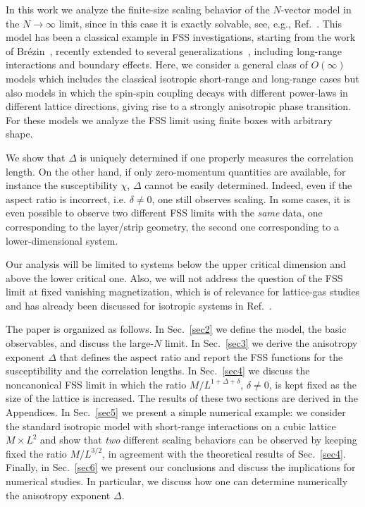 \documentclass[a4paper,12pt]{article}
\begin{document}
In this work we analyze the finite-size scaling behavior of the
$N$-vector model in the  $N \to \infty$ limit, since in this case it
is exactly solvable, see, e.g., Ref.~\cite{ZinnBook}. 
This model has been a classical
example in FSS investigations, starting from the work of
Br\'ezin~\cite{Brezin82}, recently extended to several 
generalizations~\cite{Brankov},
including long-range interactions and boundary effects.
Here, we consider a general class of $O(\infty)$ models which includes
the classical isotropic short-range and long-range cases but also
models in which the spin-spin coupling decays with different power-laws
in different lattice directions, giving rise to a strongly anisotropic
phase transition. For these models we analyze the FSS limit
using finite boxes with arbitrary shape.

We show that $\Delta$ is uniquely determined if one properly measures the 
correlation length. On the other hand, if only zero-momentum quantities 
are available, for instance the susceptibility $\chi$, $\Delta$ cannot 
be easily determined. Indeed, even if the aspect ratio is incorrect, 
i.e. $\delta \not = 0$, one still observes scaling. In some cases, it is 
even possible to observe two different FSS limits with the {\em same}
data, one corresponding to the layer/strip geometry, the second one 
corresponding to a lower-dimensional system. 

Our analysis will be limited to systems below the upper critical 
dimension and above the lower critical one. Also, we will not address
the question of the FSS limit at fixed vanishing 
magnetization, which is of relevance for lattice-gas studies and has already
been discussed for isotropic systems in Ref.~\cite{CGGP-01}. 

The paper is organized as follows. In Sec.~\ref{sec2} we define the model,
the basic observables, and discuss the large-$N$ limit. 
In Sec.~\ref{sec3} we derive the anisotropy exponent $\Delta$ that 
defines the aspect ratio and report the FSS functions for the susceptibility
and the correlation lengths. In Sec.~\ref{sec4} we discuss the 
noncanonical FSS limit in which the ratio $M/L^{1+\Delta+\delta}$, 
$\delta \not= 0$, is kept 
fixed as the size of the lattice is increased. The results of these two 
sections are derived in the Appendices. In Sec.~\ref{sec5} we present a simple 
numerical example: we consider the standard isotropic model with short-range
interactions on a cubic lattice $M\times L^2$ and show that {\em two} 
different scaling behaviors can be observed by keeping fixed the 
ratio $M/L^{3/2}$, in agreement with the theoretical results of Sec.~\ref{sec4}.
Finally, in Sec.~\ref{sec6} we present our conclusions and discuss the 
implications for numerical studies. In particular, we discuss how 
one can determine numerically the anisotropy exponent $\Delta$.
\end{document}
